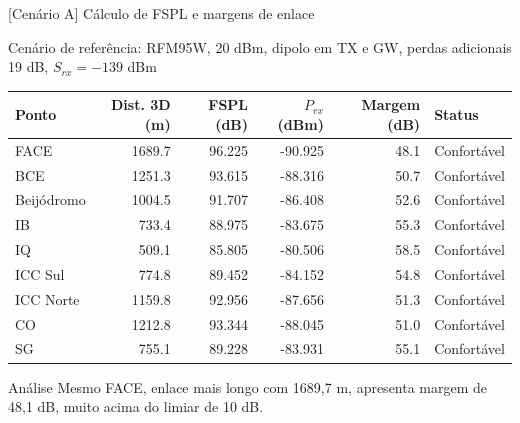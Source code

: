 \documentclass[aspectratio=169]{beamer}
\begin{document}
\begin{frame}{[Cenário A] Cálculo de FSPL e margens de enlace}
\vspace{-0.3em}
\begin{block}{\small Cenário de referência: RFM95W, 20 dBm, dipolo em TX e GW, perdas adicionais 19 dB, $S_{rx} = -139$ dBm}
\end{block}
\vspace{0.3em}
\scriptsize
\centering
\begin{tabular}{lrrrrl}
\toprule
Ponto & Dist. 3D (m) & FSPL (dB) & $P_{rx}$ (dBm) & Margem (dB) & Status \\
\midrule
FACE      & 1689.7 & 96.225 & -90.925 & 48.1 & Confortável \\
BCE       & 1251.3 & 93.615 & -88.316 & 50.7 & Confortável \\
Beijódromo & 1004.5 & 91.707 & -86.408 & 52.6 & Confortável \\
IB        &  733.4 & 88.975 & -83.675 & 55.3 & Confortável \\
IQ        &  509.1 & 85.805 & -80.506 & 58.5 & Confortável \\
ICC Sul   &  774.8 & 89.452 & -84.152 & 54.8 & Confortável \\
ICC Norte & 1159.8 & 92.956 & -87.656 & 51.3 & Confortável \\
CO        & 1212.8 & 93.344 & -88.045 & 51.0 & Confortável \\
SG        &  755.1 & 89.228 & -83.931 & 55.1 & Confortável \\
\bottomrule
\end{tabular}
\vspace{0.4em}
\begin{block}{Análise}
\small Mesmo FACE, enlace mais longo com 1689,7 m, apresenta margem de 48,1 dB, muito acima do limiar de 10 dB.
\end{block}
\end{frame}
\end{document}
